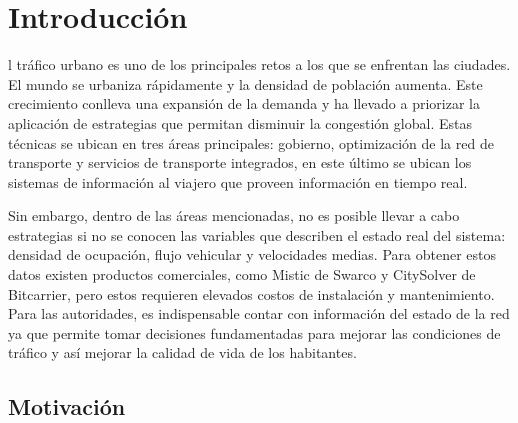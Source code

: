 \let\textcircled=\pgftextcircled
\chapter {Introducción}
\label{chap:intro}

l tráfico urbano es uno de los principales retos a los que se enfrentan las ciudades. El mundo se urbaniza rápidamente y la densidad de población aumenta. Este crecimiento conlleva una expansión de la demanda y ha llevado a priorizar la aplicación de estrategias que permitan disminuir la congestión global. Estas técnicas se ubican en tres áreas principales: gobierno, optimización de la red de transporte y servicios de transporte integrados, en este último se ubican los sistemas de información al viajero que proveen información en tiempo real. 

Sin embargo, dentro de las áreas mencionadas, no es posible llevar a cabo estrategias si no se conocen las variables que describen el estado real del sistema: densidad de ocupación, flujo vehicular y velocidades medias. Para obtener estos datos existen productos comerciales, como Mistic de Swarco y CitySolver de Bitcarrier, pero estos requieren elevados costos de instalación y mantenimiento. Para las autoridades, es indispensable contar con información del estado de la red ya que permite tomar decisiones fundamentadas para mejorar las condiciones de tráfico y así mejorar la calidad de vida de los habitantes.

\section{Motivación}
\label{sec:motivacion}

